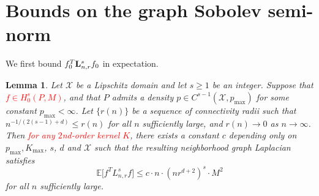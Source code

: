 \documentclass{article}
\newcommand{\1}{\mathbf{1}}
\newcommand{\Lap}{{\bf L}}
\newcommand{\Xset}{\mathcal{X}}
\newcommand{\Ebb}{\mathbb{E}}
\theoremstyle{alden}
\theoremstyle{aldenthm}
\newtheorem{lemma}{Lemma}
\theoremstyle{definition}
\theoremstyle{remark}
\begin{document}
\section{Bounds on the graph Sobolev semi-norm}
\label{sec:graph_sobolev_seminorm}
We first bound $f_0^T \Lap_{n,r}^s f_0$ in expectation.
\begin{lemma}
	\label{lem:roughness_functional_expectation_sobolev}
	Let $\Xset$ be a Lipschitz domain and let $s \geq 1$ be an integer. Suppose that \textcolor{red}{$f \in H_0^{s}(P,M)$}, and that $P$ admits a density $p \in C^{s-1}(\Xset,p_{\max})$ for some constant $p_{\max} < \infty$. Let $\{r(n)\}$ be a sequence of connectivity radii such that $n^{-1/(2(s - 1) + d)} \leq r(n)$ for all $n$ sufficiently large, and $r(n) \to 0$ as $n \to \infty$. Then \textcolor{red}{for any $2$nd-order kernel $K$}, there exists a constant $c$ depending only on $p_{\max}, K_{\max}$, $s$, $d$ and $\Xset$ such that the resulting neighborhood graph Laplacian satisfies
	\begin{equation}
	\label{eqn:roughness_functional_expectation_sobolev}
	\Ebb\bigl[f^T L_{n,r}^s f\bigr] \leq c \cdot n \cdot (nr^{d+2})^s \cdot M^2
	\end{equation}
	for all $n$ sufficiently large.
\end{lemma}
\end{document}

